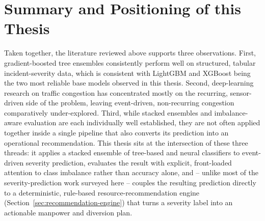 \section{Summary and Positioning of this Thesis}

Taken together, the literature reviewed above supports three observations. First, gradient-boosted tree ensembles consistently perform well on structured, tabular incident-severity data, which is consistent with LightGBM and XGBoost being the two most reliable base models observed in this thesis. Second, deep-learning research on traffic congestion has concentrated mostly on the recurring, sensor-driven side of the problem, leaving event-driven, non-recurring congestion comparatively under-explored. Third, while stacked ensembles and imbalance-aware evaluation are each individually well established, they are not often applied together inside a single pipeline that also converts its prediction into an operational recommendation. This thesis sits at the intersection of these three threads: it applies a stacked ensemble of tree-based and neural classifiers to event-driven severity prediction, evaluates the result with explicit, front-loaded attention to class imbalance rather than accuracy alone, and -- unlike most of the severity-prediction work surveyed here -- couples the resulting prediction directly to a deterministic, rule-based resource-recommendation engine (Section~\ref{sec:recommendation-engine}) that turns a severity label into an actionable manpower and diversion plan.
